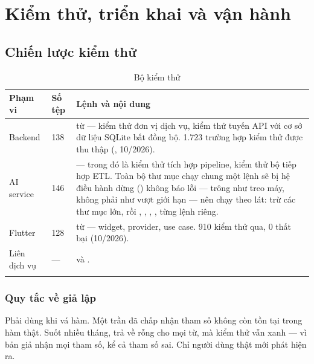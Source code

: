 \chapter{Kiểm thử, triển khai và vận hành}

\section{Chiến lược kiểm thử}

\begin{longtable}{L{3.4cm} L{2.6cm} L{7.6cm}}
\toprule
\textbf{Phạm vi} & \textbf{Số tệp} & \textbf{Lệnh và nội dung}\\
\midrule
\endhead
Backend & 138 &  từ  — kiểm thử đơn vị dịch vụ, kiểm thử tuyến API với cơ sở dữ liệu SQLite bất đồng bộ. 1.723 trường hợp kiểm thử được thu thập (, 10/2026).\\
AI service & 146 &  — trong đó  là kiểm thử tích hợp pipeline,  kiểm thử bộ tiếp hợp ETL. Toàn bộ thư mục chạy chung một lệnh sẽ bị hệ điều hành dừng () không báo lỗi — trông như treo máy, không phải như vượt giới hạn — nên chạy theo lát:  trừ các thư mục lớn, rồi , , , ,  từng lệnh riêng.\\
Flutter & 128 &  từ  — widget, provider, use case. 910 kiểm thử qua, 0 thất bại (10/2026).\\
Liên dịch vụ & — &  và .\\
\bottomrule
\caption{Bộ kiểm thử}
\end{longtable}

\subsection{Quy tắc về giả lập}

\begin{luuy}
Phải dùng  khi vá hàm. Một  trần đã chấp nhận tham số
 không còn tồn tại trong hàm thật. Suốt nhiều tháng,
 trả về rỗng cho mọi từ, mà kiểm thử vẫn xanh — vì bản giả nhận
mọi tham số, kể cả tham số sai. Chỉ người dùng thật mới phát hiện ra.
\end{luuy}

